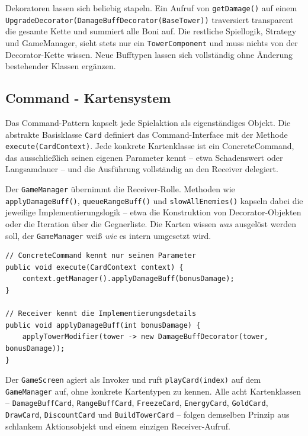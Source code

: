 Dekoratoren lassen sich beliebig stapeln. Ein Aufruf von \texttt{getDamage()}
auf einem \texttt{Upgrade\-Decorator(Damage\-Buff\-Decorator(Base\-Tower))} traversiert
transparent die gesamte Kette und summiert alle Boni auf. Die restliche
Spiellogik, Strategy und GameManager, sieht stets nur ein
\texttt{TowerComponent} und muss nichts von der Decorator-Kette wissen.
Neue Bufftypen lassen sich vollständig ohne Änderung bestehender Klassen
ergänzen.

\subsection{Command - Kartensystem}

Das Command-Pattern kapselt jede Spielaktion als eigenständiges Objekt. Die
abstrakte Basisklasse \texttt{Card} definiert das Command-Interface mit der
Methode \texttt{execute(CardContext)}. Jede konkrete Kartenklasse ist ein
ConcreteCommand, das ausschließlich seinen eigenen Parameter kennt --
etwa Schadenswert oder Langsamdauer -- und die Ausführung vollständig
an den Receiver delegiert.

Der \texttt{GameManager} übernimmt die Receiver-Rolle. Methoden wie
\texttt{apply\-Damage\-Buff()}, \texttt{queue\-Range\-Buff()} und
\texttt{slow\-All\-Enemies()} kapseln dabei die jeweilige Implementierungslogik --
etwa die Konstruktion von Decorator-Objekten oder die Iteration über die
Gegnerliste. Die Karten wissen \textit{was} ausgelöst werden soll, der
\texttt{GameManager} weiß \textit{wie} es intern umgesetzt wird.

\begin{lstlisting}[caption={Command-Pattern: DamageBuffCard delegiert an den Receiver},label=lst:command]
// ConcreteCommand kennt nur seinen Parameter
public void execute(CardContext context) {
    context.getManager().applyDamageBuff(bonusDamage);
}

// Receiver kennt die Implementierungsdetails
public void applyDamageBuff(int bonusDamage) {
    applyTowerModifier(tower -> new DamageBuffDecorator(tower, bonusDamage));
}
\end{lstlisting}

Der \texttt{GameScreen} agiert als Invoker und ruft \texttt{playCard(index)}
auf dem \texttt{GameManager} auf, ohne konkrete Kartentypen zu kennen.
Alle acht Kartenklassen -- \texttt{Damage\-Buff\-Card}, \texttt{Range\-Buff\-Card},
\texttt{FreezeCard}, \texttt{EnergyCard}, \texttt{GoldCard}, \texttt{DrawCard},
\texttt{DiscountCard} und \texttt{Build\-Tower\-Card} -- folgen demselben
Prinzip aus schlankem Aktionsobjekt und einem einzigen Receiver-Aufruf.


